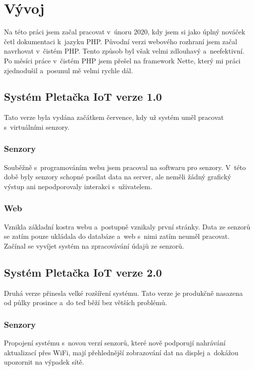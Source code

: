 \chapter{Vývoj}
Na této práci jsem začal pracovat v~únoru 2020, kdy jsem si jako úplný nováček četl dokumentaci k~jazyku PHP. 
Původní verzi webového rozhraní jsem začal navrhovat v~čistém PHP. Tento způsob byl však velmi zdlouhavý a~neefektivní.
Po měsíci práce v~čistém PHP jsem přešel na framework Nette, který mi práci zjednodušil a~posunul mě velmi rychle dál. 


\section{Systém Pletačka IoT verze 1.0}
Tato verze byla vydána začátkem července, kdy už systém uměl pracovat s~virtuálními senzory.


\subsection{Senzory}
Souběžně s~programováním webu jsem pracoval na softwaru pro senzory.
V~této době byly senzory schopné posílat data na server, ale neměli žádný grafický výstup ani nepodporovaly interakci s~uživatelem.

\subsection{Web}
Vznikla základní kostra webu a~postupně vznikaly první stránky.
Data ze senzorů se zatím pouze ukládala do databáze a~web s~nimi zatím neuměl pracovat.
Začínal se vyvíjet systém na zpracovávání údajů ze senzorů.



\section{Systém Pletačka IoT verze 2.0}
Druhá verze přinesla velké rozšíření systému.
Tato verze je produkčně nasazena od půlky prosince a~do teď běží bez větších problémů.


\subsection{Senzory}
Propojení systému s~novou verzí senzorů, které nově podporují nahrávání aktualizací přes WiFi, mají přehlednější zobrazování dat na displej a~dokážou upozornit na výpadek sítě.



